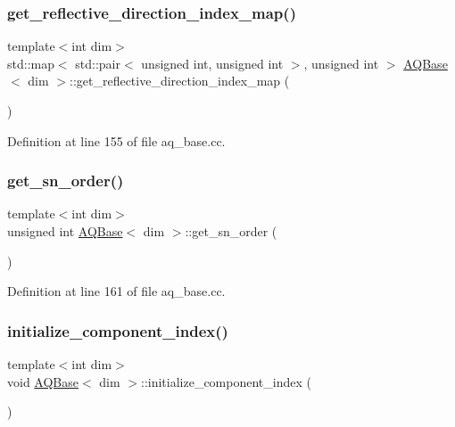 \subsubsection{\texorpdfstring{get\+\_\+reflective\+\_\+direction\+\_\+index\+\_\+map()}{get\_reflective\_direction\_index\_map()}}
{\footnotesize\ttfamily template$<$int dim$>$ \\
std\+::map$<$ std\+::pair$<$ unsigned int, unsigned int $>$, unsigned int $>$ \hyperlink{class_a_q_base}{A\+Q\+Base}$<$ dim $>$\+::get\+\_\+reflective\+\_\+direction\+\_\+index\+\_\+map (\begin{DoxyParamCaption}{ }\end{DoxyParamCaption})}



Definition at line 155 of file aq\+\_\+base.\+cc.

\mbox{\label{class_a_q_base_a9ce78884d13c584a8f415c16976ea6f0}} 
\subsubsection{\texorpdfstring{get\+\_\+sn\+\_\+order()}{get\_sn\_order()}}
{\footnotesize\ttfamily template$<$int dim$>$ \\
unsigned int \hyperlink{class_a_q_base}{A\+Q\+Base}$<$ dim $>$\+::get\+\_\+sn\+\_\+order (\begin{DoxyParamCaption}{ }\end{DoxyParamCaption})}



Definition at line 161 of file aq\+\_\+base.\+cc.

\mbox{\label{class_a_q_base_ab1cbcd2132328df15fb9651597e8ab48}} 
\subsubsection{\texorpdfstring{initialize\+\_\+component\+\_\+index()}{initialize\_component\_index()}}
{\footnotesize\ttfamily template$<$int dim$>$ \\
void \hyperlink{class_a_q_base}{A\+Q\+Base}$<$ dim $>$\+::initialize\+\_\+component\+\_\+index (\begin{DoxyParamCaption}{ }\end{DoxyParamCaption})\hspace{0.3cm}{\ttfamily [virtual]}}



